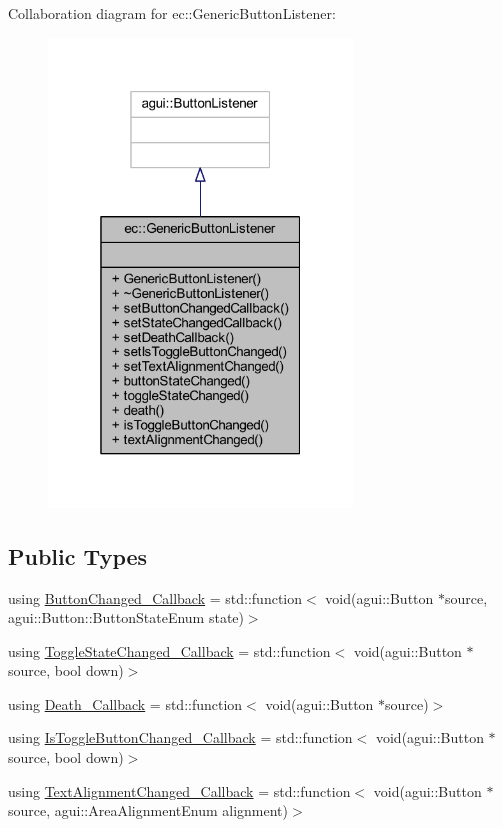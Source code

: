Collaboration diagram for ec\+:\+:Generic\+Button\+Listener\+:\nopagebreak
\begin{figure}[H]
\begin{center}
\leavevmode
\includegraphics[width=229pt]{classec_1_1_generic_button_listener__coll__graph}
\end{center}
\end{figure}
\subsection*{Public Types}
\begin{DoxyCompactItemize}
\item 
using \mbox{\hyperlink{classec_1_1_generic_button_listener_af89147c1baeadae9155f5d4e0df7abf3}{Button\+Changed\+\_\+\+Callback}} = std\+::function$<$ void(agui\+::\+Button $\ast$source, agui\+::\+Button\+::\+Button\+State\+Enum state)$>$
\item 
using \mbox{\hyperlink{classec_1_1_generic_button_listener_a528d9bd01250d4e2d7179ad64d67a364}{Toggle\+State\+Changed\+\_\+\+Callback}} = std\+::function$<$ void(agui\+::\+Button $\ast$source, bool down)$>$
\item 
using \mbox{\hyperlink{classec_1_1_generic_button_listener_aa7ca8b30098ab89eff663950d25a13eb}{Death\+\_\+\+Callback}} = std\+::function$<$ void(agui\+::\+Button $\ast$source)$>$
\item 
using \mbox{\hyperlink{classec_1_1_generic_button_listener_a7830a9f92b6e68acbbf5237d2154db95}{Is\+Toggle\+Button\+Changed\+\_\+\+Callback}} = std\+::function$<$ void(agui\+::\+Button $\ast$source, bool down)$>$
\item 
using \mbox{\hyperlink{classec_1_1_generic_button_listener_a62ab7e0ca7d7777b9aec72d7f2caf300}{Text\+Alignment\+Changed\+\_\+\+Callback}} = std\+::function$<$ void(agui\+::\+Button $\ast$source, agui\+::\+Area\+Alignment\+Enum alignment)$>$
\end{DoxyCompactItemize}
